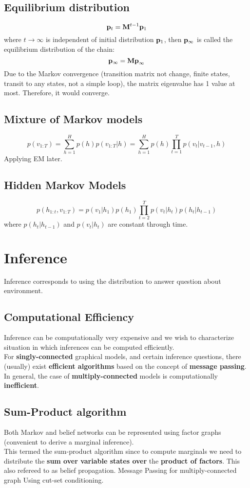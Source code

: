 \documentclass[12pt,a4paper]{article}
\begin{document}
\subsection*{Equilibrium distribution}
$$
{\bf p}_t = {\bf M}^{t-1}{\bf p}_1
$$
where $t\rightarrow \infty$ is independent of initial distribution ${\bf p}_1$, then ${\bf p}_{\infty}$ is called the equilibrium distribution of the chain:
$$
{\bf p}_\infty = {\bf Mp}_\infty
$$
Due to the Markov convergence (transition matrix not change, finite states, transit to any states, not a simple loop), the matrix eigenvalue has 1 value at most. Therefore, it would converge.
\subsection*{Mixture of Markov models}
$$
p(v_{1:T}) =\sum_{h=1}^{H}p(h)p(v_{1:T}|h)=\sum_{h=1}^{H}p(h)\prod_{t=1}^{T}p(v_t|v_{t-1},h)
$$
Applying EM later.
\subsection*{Hidden Markov Models}
$$
p(h_{1:t},v_{1:T}) = p(v_1|h_1)p(h_1)\prod_{t=2}^{T}p(v_t|h_t)p(h_t|h_{t-1})
$$
where $p(h_t|h_{t-1})$ and $p(v_t|h_t)$ are constant through time.

\section*{Inference}
Inference corresponds to using the distribution to answer question about environment.
\subsection*{Computational Efficiency}
Inference can be computationally very expensive and we wish to characterize situation in which inferences can be computed efficiently.\\
For \textbf{singly-connected} graphical models, and certain inference questions, there (usually) exist \textbf{efficient algorithms} based on the concept of \textbf{message passing}.\\
In general, the case of \textbf{multiply-connected} models is computationally \textbf{inefficient}.
\subsection*{Sum-Product algorithm}
Both Markov and belief networks can be represented using factor graphs (convenient to derive a marginal inference).\\
This termed the sum-product algorithm since to compute marginals we need to distribute the \textbf{sum over variable states over} the \textbf{product of factors}. This also refereed to as belief propagation.
\large{Message Passing for multiply-connected graph}
Using cut-set conditioning.
\end{document}
